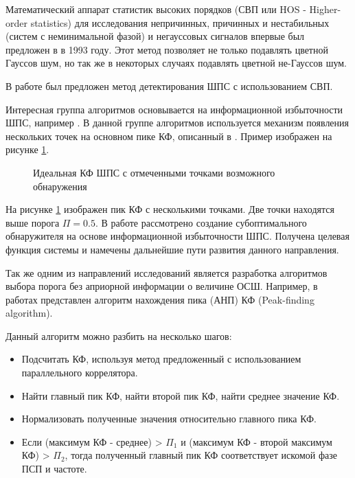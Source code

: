 Математический аппарат статистик высоких порядков (СВП или HOS - Higher-order statistics)
для исследования непричинных, причинных и нестабильных (систем с неминимальной фазой) и негауссовых сигналов впервые был предложен
в \cite{hos_petropulu} в 1993 году.  Этот метод позволяет не только подавлять цветной Гауссов шум, но так же в некоторых случаях подавлять
цветной не-Гауссов шум.

В работе \cite{hos_zhao} был предложен метод детектирования ШПС с использованием СВП.

Интересная группа алгоритмов основывается на информационной избыточности ШПС, например \cite{phd_che}. В данной
группе алгоритмов используется механизм появления нескольких точек на основном пике КФ, описанный в \cite{kaplan}. Пример
изображен на рисунке \ref{pic:sec1_peak_tcd}.
\begin{figure}[H]
        \center{}
        \caption{Идеальная КФ ШПС с отмеченными точками возможного обнаружения}
        \label{pic:sec1_peak_tcd}
\end{figure}
На рисунке \ref{pic:sec1_peak_tcd} изображен пик КФ с несколькими точками. Две точки находятся выше порога ${\Pi=0.5}$.
В работе \cite{phd_che} рассмотрено создание субоптимального обнаружителя на основе информационной избыточности ШПС.
Получена целевая функция системы и намечены дальнейшие пути развития данного направления.

Так же одним из направлений исследований является разработка алгоритмов выбора порога без априорной информации о величине ОСШ. Например,
в работах \cite{2max_ieee, 2max_article} представлен алгоритм нахождения пика (АНП) КФ (Peak-finding algorithm).

Данный алгоритм можно разбить на несколько шагов:
\begin{itemize}
\item[Шаг 1] Подсчитать КФ, используя метод предложенный с использованием параллельного коррелятора. 
\item[Шаг 2] Найти главный пик КФ, найти второй пик КФ, найти среднее значение КФ.
\item[Шаг 3] Нормализовать полученные значения относительно главного пика КФ.
\item[Шаг 4] Если (максимум КФ - среднее) > ${\Pi_1}$ и (максимум КФ - 
	второй максимум КФ) > ${\Pi_2}$, тогда полученный главный пик КФ соответствует
	искомой фазе ПСП и частоте.
\end{itemize}

